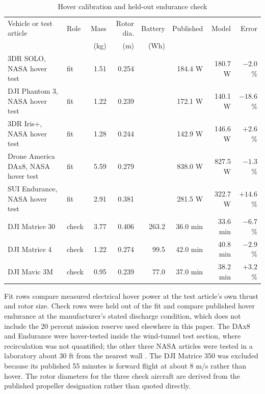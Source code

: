 \documentclass[twocolumn,letterpaper]{IEEEAerospaceCLS}
\begin{document}
\begin{table}[!tb]
\caption{Hover calibration and held-out endurance check}
\label{tab:calib}
\centering\small
\begin{tabular}{@{}L{1.55in}L{0.62in}r r r r r r@{}}
\toprule
Vehicle or test article & Role & Mass & Rotor dia. & Battery & Published & Model & Error \\
& & (kg) & (m) & (Wh) & & & \\
\midrule
3DR SOLO, NASA hover test \cite{nasatm} & fit & 1.51 & 0.254 & & 184.4 W & 180.7 W & $-2.0$\% \\
DJI Phantom 3, NASA hover test \cite{nasatm} & fit & 1.22 & 0.239 & & 172.1 W & 140.1 W & $-18.6$\% \\
3DR Iris+, NASA hover test \cite{nasatm} & fit & 1.28 & 0.244 & & 142.9 W & 146.6 W & $+2.6$\% \\
Drone America DAx8, NASA hover test \cite{nasatm} & fit & 5.59 & 0.279 & & 838.0 W & 827.5 W & $-1.3$\% \\
SUI Endurance, NASA hover test \cite{nasatm} & fit & 2.91 & 0.381 & & 281.5 W & 322.7 W & $+14.6$\% \\
DJI Matrice 30 \cite{djim30} & check & 3.77 & 0.406 & 263.2 & 36.0 min & 33.6 min & $-6.7$\% \\
DJI Matrice 4 \cite{djim4} & check & 1.22 & 0.274 & 99.5 & 42.0 min & 40.8 min & $-2.9$\% \\
DJI Mavic 3M \cite{djimavic} & check & 0.95 & 0.239 & 77.0 & 37.0 min & 38.2 min & $+3.2$\% \\
\bottomrule
\end{tabular}

\vspace{2pt}
\begin{minipage}{\textwidth}\footnotesize
Fit rows compare measured electrical hover power at the test article's own thrust and rotor size. Check rows were held out of the fit and compare published hover endurance at the manufacturer's stated discharge condition, which does not include the 20 percent mission reserve used elsewhere in this paper. The DAx8 and Endurance were hover-tested inside the wind-tunnel test section, where recirculation was not quantified; the other three NASA articles were tested in a laboratory about 30 ft from the nearest wall \cite{russell2016}. The DJI Matrice 350 was excluded because its published 55 minutes is forward flight at about 8 m/s rather than hover. The rotor diameters for the three check aircraft are derived from the published propeller designation rather than quoted directly.
\end{minipage}
\end{table}
\end{document}
